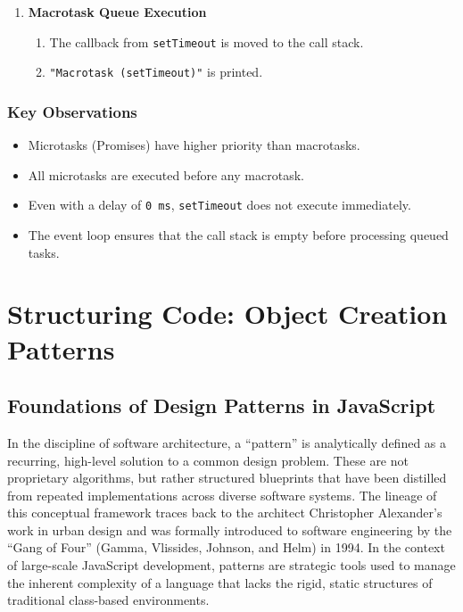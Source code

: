 \documentclass{scrbook}
\begin{document}
\begin{enumerate}
    After all microtasks are completed, the event loop checks the Macrotask Queue.

    \item \textbf{Macrotask Queue Execution}
    \begin{enumerate}[label*=\arabic*.]
        \item The callback from \texttt{setTimeout} is moved to the call stack.
        \item \texttt{"Macrotask (setTimeout)"} is printed.
    \end{enumerate}
\end{enumerate}

\subsection{Key Observations}

\begin{itemize}
    \item Microtasks (Promises) have higher priority than macrotasks.
    \item All microtasks are executed before any macrotask.
    \item Even with a delay of \texttt{0 ms}, \texttt{setTimeout} does not execute immediately.
    \item The event loop ensures that the call stack is empty before processing queued tasks.
\end{itemize}

\chapter{Structuring Code: Object Creation Patterns}

\section{Foundations of Design Patterns in JavaScript}

In the discipline of software architecture, a ``pattern'' is analytically defined as a recurring, high-level solution to a common design problem. These are not proprietary algorithms, but rather structured blueprints that have been distilled from repeated implementations across diverse software systems. The lineage of this conceptual framework traces back to the architect Christopher Alexander's work in urban design and was formally introduced to software engineering by the ``Gang of Four'' (Gamma, Vlissides, Johnson, and Helm) in 1994. In the context of large-scale JavaScript development, patterns are strategic tools used to manage the inherent complexity of a language that lacks the rigid, static structures of traditional class-based environments.\\
\end{document}
